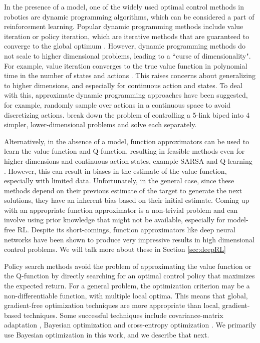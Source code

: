 In the presence of a model, one of the widely used optimal control methods in robotics are dynamic programming algorithms, which can be considered a part of reinforcement learning. Popular dynamic programming methods include value iteration or policy iteration, which are iterative methods that are guaranteed to converge to the global optimum \citep{bertsekas1995neuro}. However, dynamic programming methods do not scale to higher dimensional problems, leading to a ``curse of dimensionality". For example, value iteration converges to the true value function in polynomial time in the number of states and actions \citep{sutton1998reinforcement}. This raises concerns about generalizing to higher dimensions, and especially for continuous action and states. To deal with this, approximate dynamic programming approaches have been suggested, for example, \cite{atkeson2007randomly} randomly sample over actions in a continuous space to avoid discretizing actions. \cite{whitman2009control} break down the problem of controlling a 5-link biped into  4 simpler, lower-dimensional problems and solve each separately. 

Alternatively, in the absence of a model, function approximators can be used to learn the value function and Q-function, resulting in feasible methods even for higher dimensions and continuous action states, example SARSA and Q-learning  \citep{busoniu2010reinforcement}. However, this can result in biases in the estimate of the value function, especially with limited data. Unfortunately, in the general case, since these methods depend on their previous estimate of the target to generate the next solutions, they have an inherent bias based on their initial estimate. Coming up with an appropriate function approximator is a non-trivial problem and can involve using prior knowledge that might not be available, especially for model-free RL. Despite its short-comings, function approximators like deep neural networks have been shown to produce very impressive results in high dimensional control problems. We will talk more about these in Section \ref{sec:deepRL}

Policy search methods avoid the problem of approximating the value function or the Q-function by directly searching for an optimal control policy that maximizes the expected return. For a general problem, the optimization criterion may be a non-differentiable function, with multiple local optima. This means that global, gradient-free optimization techniques are more appropriate than local, gradient-based techniques. Some successful techniques include covariance-matrix adaptation \cite{hansen2006cma}, Bayesian optimization \cite{BOtutorial2016} and cross-entropy optimization \cite{rubinstein1999cross}. We primarily use Bayesian optimization in this work, and we describe that next.

